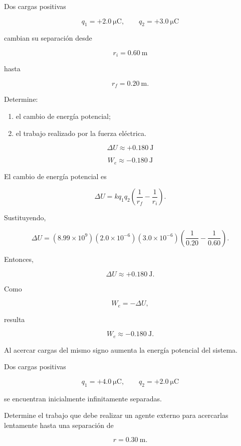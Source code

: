 \begin{ejercicio}

Dos cargas positivas

\[
q_1=+\SI{2.0}{\micro\coulomb},
\qquad
q_2=+\SI{3.0}{\micro\coulomb}
\]

cambian su separación desde

\[
r_i=\SI{0.60}{\metre}
\]

hasta

\[
r_f=\SI{0.20}{\metre}.
\]

Determine:

\begin{enumerate}
    \item el cambio de energía potencial;
    \item el trabajo realizado por la fuerza eléctrica.
\end{enumerate}

\end{ejercicio}

\begin{respuesta}

\[
\boxed{\Delta U\approx+\SI{0.180}{\joule}}
\]

\[
\boxed{W_e\approx-\SI{0.180}{\joule}}
\]

\end{respuesta}

\begin{explicacion}

El cambio de energía potencial es

\[
\Delta U
=
kq_1q_2
\left(
\frac{1}{r_f}-\frac{1}{r_i}
\right).
\]

Sustituyendo,

\[
\Delta U
=
(8.99\times10^9)
(2.0\times10^{-6})(3.0\times10^{-6})
\left(
\frac{1}{0.20}-\frac{1}{0.60}
\right).
\]

Entonces,

\[
\boxed{\Delta U\approx+\SI{0.180}{\joule}}.
\]

Como

\[
W_e=-\Delta U,
\]

resulta

\[
\boxed{W_e\approx-\SI{0.180}{\joule}}.
\]

Al acercar cargas del mismo signo aumenta la energía potencial del sistema.

\end{explicacion}


\begin{ejercicio}

Dos cargas positivas

\[
q_1=+\SI{4.0}{\micro\coulomb},
\qquad
q_2=+\SI{2.0}{\micro\coulomb}
\]

se encuentran inicialmente infinitamente separadas.

Determine el trabajo que debe realizar un agente externo para acercarlas lentamente
hasta una separación de

\[
r=\SI{0.30}{\metre}.
\]

\end{ejercicio}

